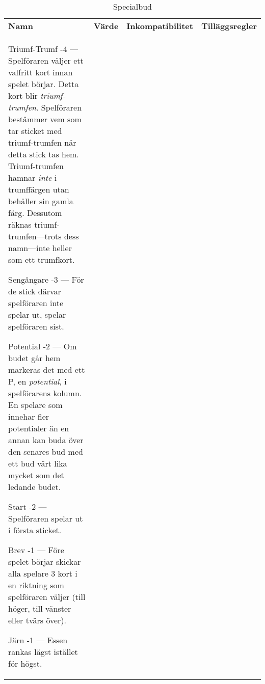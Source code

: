 %
%
%
%

\begin{table}
	\caption{Specialbud}\label{tab:specialBids}
	\begin{center}
		\begin{tabularx}{\textwidth}{
			l
			S[table-number-alignment=center, table-figures-decimal=0]
			p{3cm}
			|X
		}
			\textbf{Namn} &
			\textbf{Värde} &
			\textbf{Inkompatibilitet} &
			\textbf{Tilläggsregler}
			\\[-3ex]

			\specialBidItem%
			{Triumf-Trumf}
			{-4}
			{---}
			{%
				Spelföraren väljer ett valfritt kort innan spelet börjar. Detta kort blir \emph{triumf-trumfen}. Spelföraren bestämmer vem som tar sticket med triumf-trumfen när detta stick tas hem. Triumf-trumfen hamnar \emph{inte} i trumffärgen utan behåller sin gamla färg. Dessutom räknas triumf-trumfen---trots dess namn---inte heller som ett trumfkort.
			}

			\specialBidItem%
			{Sengångare}
			{-3}
			{---}
			{%
				För de stick därvar spelföraren inte spelar ut, spelar spelföraren sist.
			}

			\specialBidItem%
			{Potential}
			{-2}
			{---}
			{%
				Om budet går hem markeras det med ett P, en \emph{potential}, i spelförarens kolumn. En spelare som innehar fler potentialer än en annan kan buda över den senares bud med ett bud värt lika mycket som det ledande budet.
			}

			\specialBidItem%
			{Start}
			{-2}
			{---}
			{%
				Spelföraren spelar ut i första sticket.
			}

			\specialBidItem%
			{Brev}
			{-1}
			{---}
			{%
				Före spelet börjar skickar alla spelare 3 kort i en riktning som spelföraren väljer (till höger, till vänster eller tvärs över).
			}

			\specialBidItem%
			{Järn}
			{-1}
			{---}
			{%
				Essen rankas lägst istället för högst.
			}


\end{tabularx}
\end{center}
\end{table}
